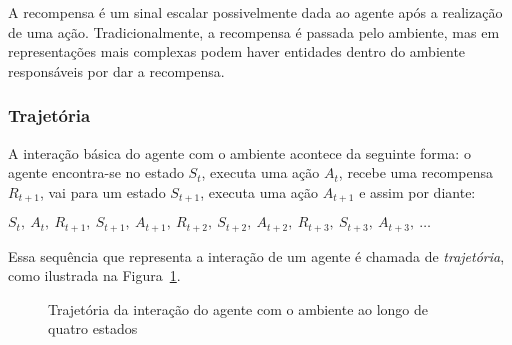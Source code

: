 \documentclass{article}
\begin{document}
                A recompensa é um sinal escalar possivelmente dada ao agente após a realização de uma ação. Tradicionalmente, a recompensa é passada pelo ambiente, mas em representações mais complexas podem haver entidades dentro do ambiente responsáveis por dar a recompensa. 
            
            \subsubsection{Trajetória}
            
                A interação básica do agente com o ambiente acontece da seguinte forma: o agente encontra-se no estado $S_t$, executa uma ação $A_t$, recebe uma recompensa $R_{t+1}$, vai para um estado $S_{t+1}$, executa uma ação $A_{t+1}$ e assim por diante:

                $S_t,\ A_t,\ R_{t+1},\ S_{t+1},\ A_{t+1},\ R_{t+2},\ S_{t+2},\ A_{t+2},\ R_{t+3},\ S_{t+3},\ A_{t+3},\ \dots$
                
                Essa sequência que representa a interação de um agente é chamada de \emph{trajetória}, como ilustrada na Figura~\ref{fig:trajectory}.

                \begin{figure}[ht]
                    \centering
                    \caption{Trajetória da interação do agente com o ambiente ao longo de quatro estados}
                    \label{fig:trajectory}
                \end{figure}
                
\end{document}
